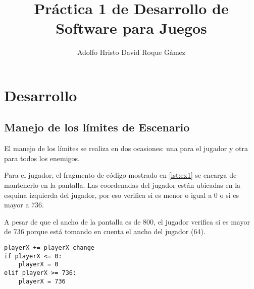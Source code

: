 \documentclass{article}
\title{Práctica 1 de Desarrollo de Software para Juegos}
\author{Adolfo Hristo David Roque Gámez}
\begin{document}
\maketitle
\section{Desarrollo}
\subsection{Manejo de los límites de Escenario}
El manejo de los límites se realiza en dos ocasiones: una para el jugador y otra para todos los enemigos.

Para el jugador, el fragmento de código mostrado en \ref{lst:ex1} se encarga de mantenerlo en la pantalla. Las coordenadas del jugador están ubicadas en la esquina izquierda del jugador, por eso verifica si es menor o igual a 0 o si es mayor a 736.

A pesar de que el ancho de la pantalla es de 800, el jugador verifica si es mayor de 736 porque está tomando en cuenta el ancho del jugador (64).

\begin{lstlisting}[caption={Código que se encarga de controlar el límite del jugador},label=lst:ex1]
playerX += playerX_change
if playerX <= 0:
    playerX = 0
elif playerX >= 736:
    playerX = 736
\end{lstlisting}
\end{document}

